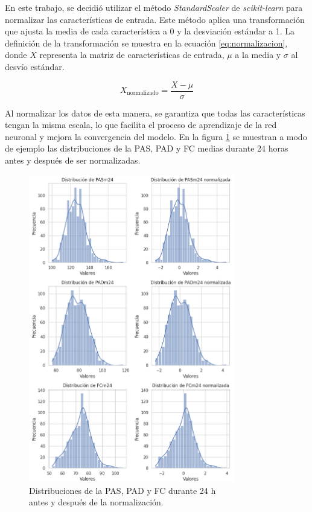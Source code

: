 En este trabajo, se decidió utilizar el método \emph{StandardScaler} de \emph{scikit-learn} \citep{CITE:50} para 
normalizar las características de entrada. Este método aplica una transformación que ajusta la 
media de cada característica a 0 y la desviación estándar a 1. La definición de la transformación 
se muestra en la ecuación \ref{eq:normalizacion}, donde $X$ representa la matriz de características de 
entrada, $\mu$ a la media y $\sigma$ al desvío estándar. 

\begin{equation}
	\label{eq:normalizacion}
	X_{\text{normalizado}} = \frac{X - \mu}{\sigma}
\end{equation}

Al normalizar los datos de esta manera, se garantiza que todas las características tengan la 
misma escala, lo que facilita el proceso de aprendizaje de la red neuronal y mejora la convergencia 
del modelo. En la figura \ref{fig:normalizacion} se muestran a modo de ejemplo las distribuciones de 
la PAS, PAD y FC medias durante 24 horas antes y después de ser normalizadas. 

\begin{figure}[H]
	\centering
	\includegraphics[width=0.8\textwidth]{./Figures/normalizacion.png}
	\caption{Distribuciones de la PAS, PAD y FC durante 24 h \\antes y después de la normalización.}\label{fig:normalizacion}
\end{figure}

